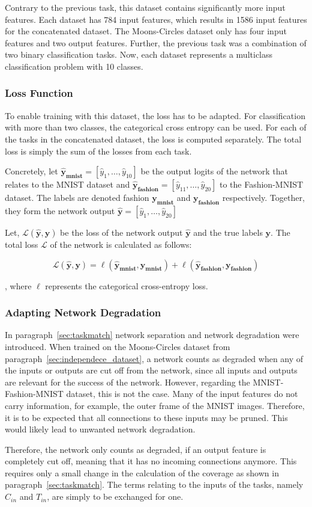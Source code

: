 Contrary to the previous task, this dataset contains significantly more input features.
Each dataset has 784 input features, which results in 1586 input features for the concatenated dataset.
The Moons-Circles dataset only has four input features and two output features.
Further, the previous task was a combination of two binary classification tasks.
Now, each dataset represents a multiclass classification problem with 10 classes.

\subsubsection{Loss Function}
To enable training with this dataset, the loss has to be adapted.
For classification with more than two classes, the categorical cross entropy can be used.
For each of the tasks in the concatenated dataset, the loss is computed separately.
The total loss is simply the sum of the losses from each task.

Concretely, let $\mathbf{\hat y_{mnist}} = \left[\hat y_1, \dots, \hat y_{10}\right]$ be the output logits of the network that relates to the MNIST dataset and $\mathbf{\hat y_{fashion}} = \left[\hat y_{11}, \dots, \hat y_{20}\right]$ to the Fashion-MNIST dataset.
The labels are denoted fashion $\mathbf{y_{mnist}}$ and $\mathbf{y_{fashion}}$ respectively.
Together, they form the network output $\mathbf{\hat y} = \left[\hat y_1, \dots, \hat y_{20}\right]$

Let, $\mathcal{L} (\mathbf{\hat y}, \mathbf{y})$ be the loss of the network output $\mathbf{\hat y}$ and the true labels $\mathbf{y}$.
The total loss $\mathcal{L}$ of the network is calculated as follows:

\[
\mathcal{L}  (\mathbf{\hat y}, \mathbf{y})
= \ell  (\mathbf{\hat y_{mnist}}, \mathbf{y_{mnist}})
+ \ell (\mathbf{\hat y_{fashion}}, \mathbf{y_{fashion}})
\]

, where $\ell$ represents the categorical cross-entropy loss.

\subsubsection{Adapting Network Degradation}
In paragraph~\ref{sec:taskmatch} network separation and network degradation were introduced.
When trained on the Moons-Circles dataset from paragraph~\ref{sec:independece_dataset}, a network counts as degraded when any of the inputs or outputs are cut off from the network, since all inputs and outputs are relevant for the success of the network.
However, regarding the MNIST-Fashion-MNIST dataset, this is not the case.
Many of the input features do not carry information, for example, the outer frame of the MNIST images.
Therefore, it is to be expected that all connections to these inputs may be pruned.
This would likely lead to unwanted network degradation.

Therefore, the network only counts as degraded, if an output feature is completely cut off, meaning that it has no incoming connections anymore.
This requires only a small change in the calculation of the coverage as shown in paragraph~\ref{sec:taskmatch}.
The terms relating to the inputs of the tasks, namely $C_{in}$ and $T_{in}$, are simply to be exchanged for one.